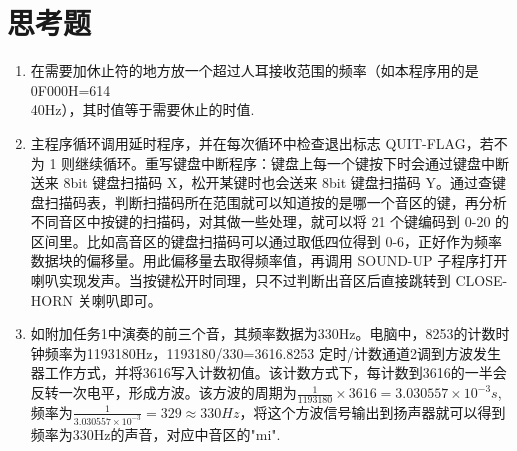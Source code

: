 \documentclass[12pt, a4paper, oneside]{ctexart}
\begin{document}
\section{思考题}
\begin{enumerate}
    \item 在需要加休止符的地方放一个超过人耳接收范围的频率（如本程序用的是0F000H=614\\40Hz），其时值等于需要休止的时值.
    \item 主程序循环调用延时程序，并在每次循环中检查退出标志 QUIT-FLAG，若不为 1 则继续循环。重写键盘中断程序：键盘上每一个键按下时会通过键盘中断送来 8bit 键盘扫描码 X，松开某键时也会送来 8bit 键盘扫描码 Y。通过查键盘扫描码表，判断扫描码所在范围就可以知道按的是哪一个音区的键，再分析不同音区中按键的扫描码，对其做一些处理，就可以将 21 个键编码到 0-20 的区间里。比如高音区的键盘扫描码可以通过取低四位得到 0-6，正好作为频率数据块的偏移量。用此偏移量去取得频率值，再调用 SOUND-UP 子程序打开喇叭实现发声。当按键松开时同理，只不过判断出音区后直接跳转到 CLOSE-HORN 关喇叭即可。
    \item 如附加任务1中演奏的前三个音，其频率数据为330Hz。电脑中，8253的计数时钟频率为1193180Hz，1193180/330=3616.8253 定时/计数通道2调到方波发生器工作方式，并将3616写入计数初值。该计数方式下，每计数到3616的一半会反转一次电平，形成方波。该方波的周期为$\frac{1}{1193180}\times 3616=3.030557\times 10^{-3}s$,频率为$\frac{1}{3.030557\times 10^{-3}}=329\approx330Hz$，将这个方波信号输出到扬声器就可以得到频率为330Hz的声音，对应中音区的"mi".
\end{enumerate}
\end{document}
